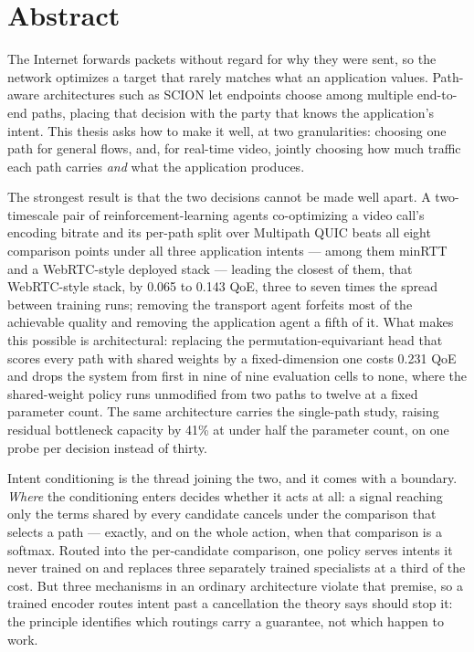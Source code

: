 \chapter*{Abstract}

The Internet forwards packets without regard for why they were sent, so the network optimizes a target
that rarely matches what an application values. Path-aware architectures such as SCION let endpoints
choose among multiple end-to-end paths, placing that decision with the party that knows the
application's intent. This thesis asks how to make it well, at two granularities: choosing one path for
general flows, and, for real-time video, jointly choosing how much traffic each path carries
\emph{and} what the application produces.

The strongest result is that the two decisions cannot be made well apart. A two-timescale pair of
reinforcement-learning agents co-optimizing a video call's encoding bitrate and its per-path split over
Multipath QUIC beats all eight comparison points under all three application intents --- among them
minRTT and a WebRTC-style deployed stack --- leading the closest of them, that WebRTC-style stack, by
0.065 to 0.143 QoE, three to seven times the spread between training runs; removing the transport agent
forfeits most of the achievable quality and removing the application agent a fifth of it. What makes this
possible is architectural: replacing the permutation-equivariant head that scores every path with shared
weights by a fixed-dimension one costs 0.231 QoE and drops the system from first in nine of nine
evaluation cells to none, where the shared-weight policy runs unmodified from two paths to twelve
at a fixed parameter count. The same architecture carries the single-path study, raising residual
bottleneck capacity by 41\% at under half the parameter count, on one probe per decision instead of
thirty.

Intent conditioning is the thread joining the two, and it comes with a boundary. \emph{Where} the
conditioning enters decides whether it acts at all: a signal reaching only the terms shared by every
candidate cancels under the comparison that selects a path --- exactly, and on the whole action, when
that comparison is a softmax. Routed into the per-candidate comparison, one policy serves intents it
never trained on and replaces three separately trained specialists at a third of the cost. But three
mechanisms in an ordinary architecture violate that premise, so a trained encoder routes intent past a
cancellation the theory says should stop it: the principle identifies which
routings carry a guarantee, not which happen to work.

